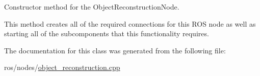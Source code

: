 \-Constructor method for the \-Object\-Reconstruction\-Node. 

\-This method creates all of the required connections for this \-R\-O\-S node as well as starting all of the subcomponents that this functionality requires. 

\-The documentation for this class was generated from the following file\-:\begin{DoxyCompactItemize}
\item 
ros/nodes/\hyperlink{object__reconstruction_8cpp}{object\-\_\-reconstruction.\-cpp}\end{DoxyCompactItemize}
